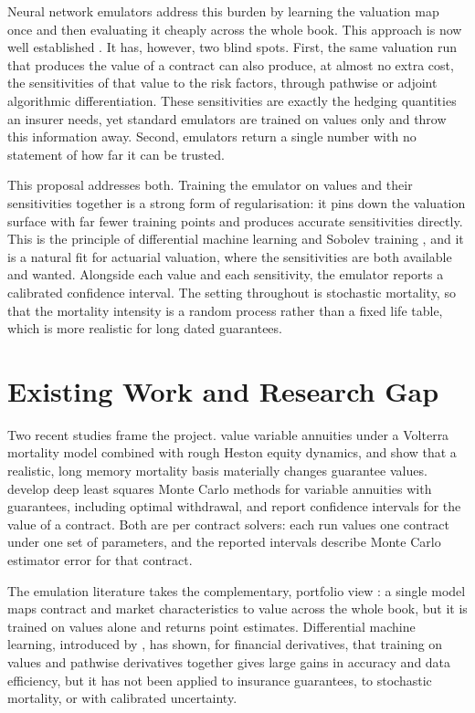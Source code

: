\documentclass[12pt,a4paper]{article}
\begin{document}
Neural network emulators address this burden by learning the valuation map once and then evaluating it cheaply across the whole book. This approach is now well established \citep{hejazi2016neural, gan2017efficient}. It has, however, two blind spots. First, the same valuation run that produces the value of a contract can also produce, at almost no extra cost, the sensitivities of that value to the risk factors, through pathwise or adjoint algorithmic differentiation. These sensitivities are exactly the hedging quantities an insurer needs, yet standard emulators are trained on values only and throw this information away. Second, emulators return a single number with no statement of how far it can be trusted.

This proposal addresses both. Training the emulator on values and their sensitivities together is a strong form of regularisation: it pins down the valuation surface with far fewer training points and produces accurate sensitivities directly. This is the principle of differential machine learning \citep{huge2020differential} and Sobolev training \citep{czarnecki2017sobolev}, and it is a natural fit for actuarial valuation, where the sensitivities are both available and wanted. Alongside each value and each sensitivity, the emulator reports a calibrated confidence interval. The setting throughout is stochastic mortality, so that the mortality intensity is a random process rather than a fixed life table, which is more realistic for long dated guarantees.

\section{Existing Work and Research Gap}
Two recent studies frame the project. \citet{li2026valuation} value variable annuities under a Volterra mortality model combined with rough Heston equity dynamics, and show that a realistic, long memory mortality basis materially changes guarantee values. \citet{langrene2026deep} develop deep least squares Monte Carlo methods for variable annuities with guarantees, including optimal withdrawal, and report confidence intervals for the value of a contract. Both are per contract solvers: each run values one contract under one set of parameters, and the reported intervals describe Monte Carlo estimator error for that contract.

The emulation literature takes the complementary, portfolio view \citep{hejazi2016neural, gan2017efficient}: a single model maps contract and market characteristics to value across the whole book, but it is trained on values alone and returns point estimates. Differential machine learning, introduced by \citet{huge2020differential}, has shown, for financial derivatives, that training on values and pathwise derivatives together gives large gains in accuracy and data efficiency, but it has not been applied to insurance guarantees, to stochastic mortality, or with calibrated uncertainty.
\end{document}
